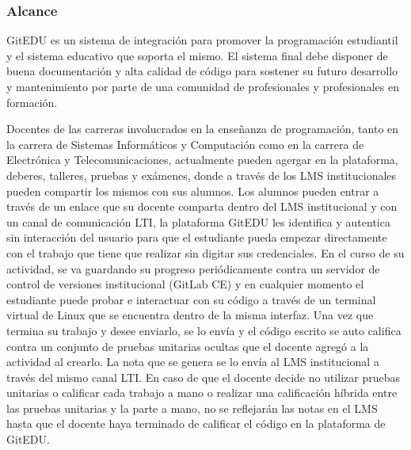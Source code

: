 \subsubsection{Alcance}
GitEDU es un sistema de integración para promover la programación estudiantil y el sistema educativo que soporta el mismo. El sistema final debe disponer de buena documentación y alta calidad de código para sostener su futuro desarrollo y mantenimiento por parte de una comunidad de profesionales y profesionales en formación.

      
Docentes de las carreras involucrados en la enseñanza de programación, tanto en la carrera de Sistemas Informáticos y Computación como en la carrera de Electrónica y Telecomunicaciones, actualmente pueden agergar en la plataforma, deberes, talleres, pruebas y exámenes, donde a través de los LMS  institucionales pueden compartir los mismos con sus alumnos. Los alumnos pueden entrar a través de un enlace que su docente comparta dentro del LMS  institucional y con un canal de comunicación LTI, la plataforma GitEDU les identifica y autentica sin interacción del usuario para que el estudiante pueda empezar directamente con el trabajo que tiene que realizar sin digitar sus credenciales. En el curso de su actividad, se va guardando su progreso periódicamente contra un servidor de control de versiones institucional (GitLab CE) y en cualquier momento el estudiante puede probar e interactuar con su código a través de un terminal virtual de Linux que se encuentra dentro de la misma interfaz. Una vez que termina su trabajo y desee enviarlo, se lo envía y el código escrito se auto califica contra un conjunto de pruebas unitarias ocultas que el docente agregó a la actividad al crearlo. La nota que se genera se lo envía al LMS  institucional a través del mismo canal LTI. En caso de que el docente decide no utilizar pruebas unitarias o calificar cada trabajo a mano o realizar una calificación híbrida entre las pruebas unitarias y la parte a mano, no se reflejarán las notas en el LMS  hasta que el docente haya terminado de calificar el código en la plataforma de GitEDU.

